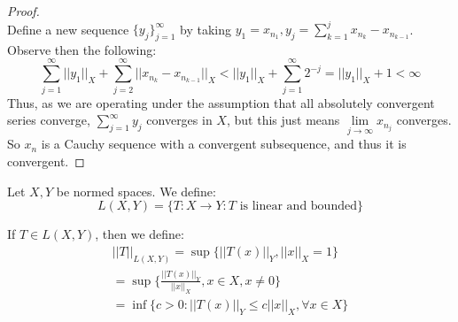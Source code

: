 \documentclass[12pt]{article}
\newenvironment{theorem}[2][Theorem]{\begin{trivlist}
\item[\hskip \labelsep {\bfseries #1}\hskip \labelsep {\bfseries #2.}]}{\end{trivlist}}
\newenvironment{definition}[2][Definition]{\begin{trivlist}
\item[\hskip \labelsep {\bfseries #1}\hskip \labelsep {\bfseries #2.}]}{\end{trivlist}}
\begin{document}
\begin{theorem}{(Completeness Characterization)}
\begin{proof}
\begin{equation}
    \end{equation}
    Define a new sequence $\{y_j\}_{j = 1}^\infty$ by taking $y_1 = x_{n_1}, y_j = \sum_{k = 1}^j x_{n_k} - x_{n_{k -1}}$. Observe then the following:
    \begin{equation}
        \sum_{j = 1}^\infty ||y_1||_X + \sum_{j = 2}^\infty ||x_{n_k} - x_{n_{k-1}}||_X < ||y_1||_X + \sum_{j = 1}^\infty 2^{-j} = ||y_1||_X + 1 < \infty
    \end{equation}
    Thus, as we are operating under the assumption that all absolutely convergent series converge, $\sum_{j = 1}^\infty y_j$ converges in $X$, but this just means $\underset{j \rightarrow \infty}{\lim} x_{n_j}$ converges. So $x_n$ is a Cauchy sequence with a convergent subsequence, and thus it is convergent.
\end{proof}
\end{theorem}
\begin{definition}{(Space of Linear Bounded Operators)}
    Let $X, Y$ be normed spaces. We define:
    \begin{equation}
        L(X,Y) = \{T : X \rightarrow Y : T \text{ is linear and bounded}\}
    \end{equation}
\end{definition}
\begin{definition}{(Operator Norm)}
    If $T \in L(X,Y)$, then we define:
    \begin{equation}
        \begin{aligned}
            ||T||_{L(X,Y)} = \sup \{||T(x)||_Y, ||x||_X = 1\} \\ 
            = \sup \Big \{ \frac{||T(x)||_Y}{||x||_X}, x \in X, x \neq 0 \Big \} \\
            = \inf \{ c > 0 : ||T(x)||_Y \leq c||x||_X,  \forall x \in X \}
        \end{aligned}
    \end{equation}
\end{definition}
\end{document}

